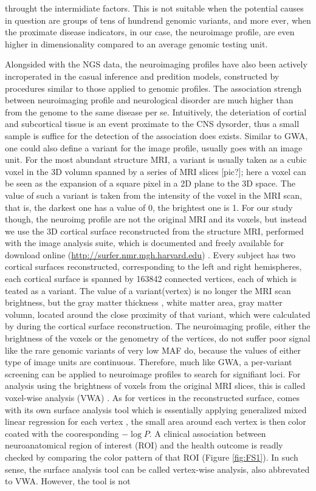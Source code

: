 throught the intermidiate factors. This is not suitable when the potential causes in question are groups of tens of hundrend genomic variants, and more ever, when the proximate disease indicators, in our case, the neuroimage profile, are even higher in dimensionality compared to an average genomic testing unit.

Alongsided with the NGS data, the neuroimaging profiles have also been actively incroperated in the casual inference and predition models, constructed by procedures similar to those applied to genomic profiles. The association strengh between neuroimaging profile and neurological disorder are much higher than from the genome to the same disease per se. Intuitively, the deteriation of cortial and subcortical tissue is an event proximate to the CNS dysorder, thus a small sample is suffice for the detection of the association does exists. Similar to GWA, one could also define a variant for the image profile, usually goes with an image unit. For the most abundant structure MRI, a variant is usually taken as a cubic voxel in the 3D volumn spanned by a series of MRI slices [pic?]; here a voxel can be seen as the expansion of a square pixel in a 2D plane to the 3D space. The value of such a variant is taken from the intensity of the voxel in the MRI scan, that is, the darkest one has a value of 0, the brightest one is 1. For our study though, the neuroimg profile are not the original MRI and its voxels, but instead we use the 3D cortical surface reconstructed from the structure MRI, performed with the \FS image analysis suite, which is documented and freely available for download online (\url{http://surfer.nmr.mgh.harvard.edu}) \cite{FS:Intro}. Every subject has two cortical surfaces reconstructed, corresponding to the left and right hemispheres, each cortical surface is spanned by 163842 connected vertices, each of which is teated as a variant. The value of a variant(vertex) is no longer the MRI scan brightness, but the gray matter thickness \cite{FS:Tck1, FS:Tck2}, white matter area, gray matter volumn, located around the close proximity of that variant, which were calculated by \FS during the cortical surface reconstruction. The neuroimaging profile, either the brightness of the voxels or the genometry of the vertices, do not suffer poor signal like the rare genomic variants of very low MAF do, because the values of either type of image units are continuous. Therefore, much like GWA, a per-variant screening can be applied to neuroimage profiles to search for signifiant loci. For analysis using the brightness of voxels from the original MRI slices, this is called voxel-wise analysis (VWA) \cite{VWA1, VWA2, VWA3, VWA4}. As for vertices in the reconstructed surface, \FS comes with its own surface analysis tool which is essentially applying generalized mixed linear regression for each vertex \cite{FS:Anl1, FS:Anl2}, the small area around each vertex is then color coated with the cooresponding $-\log{P}$. A clinical association between neuroanatomical region of interest (ROI) and the health outcome is readly checked by comparing the color pattern of that ROI (Figure \ref{fig:FS1}). In such sense, the \FS surface analysis tool can be called vertex-wise analysis, also abbrevated to VWA. However, the \FS tool is not 